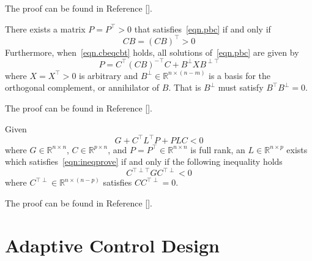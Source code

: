 \documentclass[]{../sty/aiaa-tc}
\begin{document}
  \begin{proof-dan}
    The proof can be found in Reference [].
  \end{proof-dan}

  \begin{cor-dan}
    There exists a matrix $P=P^{\top}>0$ that satisfies\ \eqref{eqn.pbc} if and only if
    \begin{equation}
      \label{eqn.cbeqcbt}
      CB=(CB)^{\top}>0
    \end{equation}
    Furthermore, when\ \eqref{eqn.cbeqcbt} holds, all solutions of\ \eqref{eqn.pbc} are given by
    \begin{equation}
      \label{eqn.P}
      P=C^{\top}(CB)^{-\top}C+B^{\perp}XB^{\perp\top}
    \end{equation}
    where $X=X^{\top}>0$ is arbitrary and $B^{\perp}\in\mathbb{R}^{n\times(n-m)}$ is a basis for the orthogonal complement, or annihilator of $B$.
    That is $B^{\perp}$ must satisfy $B^{\top}B^{\perp}=0$.
  \end{cor-dan}

  \begin{proof-dan}
    The proof can be found in Reference [].
  \end{proof-dan}

  \begin{lem-dan}\label{lem.elimination}
    Given
    \begin{equation}
      \label{eqn:ineqprove}
      G+C^{\top}L^{\top}P+PLC<0
    \end{equation}
    where $G\in\mathbb{R}^{n\times n}$, $C\in\mathbb{R}^{p\times n}$, and $P=P^{\top}\in\mathbb{R}^{n\times n}$ is full rank, an $L\in\mathbb{R}^{n\times p}$ exists which satisfies\ \eqref{eqn:ineqprove} if and only if the following inequality holds
    \begin{equation*}
      C^{\top\perp\top}GC^{\top\perp}<0
    \end{equation*}
    where $C^{\top\perp}\in\mathbb{R}^{n\times(n-p)}$ satisfies $CC^{\top\perp}=0$.
  \end{lem-dan}

  \begin{proof-dan}
    The proof can be found in Reference [].
  \end{proof-dan}

  \section{Adaptive Control Design}\label{sec.adaptivecontroldesign}
\end{document}
